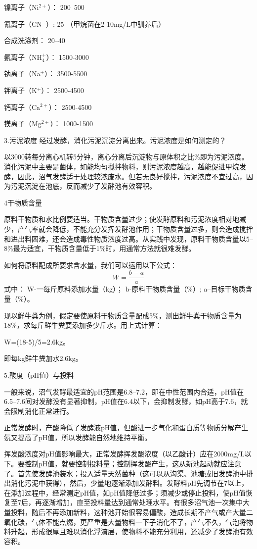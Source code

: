 \documentclass{ctexbook}
\begin{document}
镍离子（Ni$^{2+}$）：	  200~500

氰离子（CN$^{-}$）:	25 （甲烷菌在2-10mg/L中驯养后）

合成洗涤剂：	20--40

氨离子（NH$_4^{+}$）：	1500-3000

钠离子（Na$^{+}$）：	3500-5500

钾离子（K$^{+}$）：	2500-4500

钙离子（Ca$^{2+}$）：	2500-4500

镁离子（Mg$^{2+}$）：	1000-1500

3.污泥浓度	
经过发酵，消化污泥沉淀分离出来。污泥浓度是如何测定的？

以3000转每分离心机转5分钟，离心分离后沉淀物与原体积之比\%即为污泥浓度。消化污泥中主要是菌体，如能均匀搅拌物料，则污泥浓度越高，越能促进甲烷发酵，因此，沼气发酵适于处理较浓废水。但若无良好搅拌，污泥浓度不宜过高，因为污泥沉淀在池底，反而减少了发酵池有效容积。

4干物质含量

原料干物质和水比例要适当。干物质含量过少；使发酵原料和污泥浓度相对地减少，产气率就会降低，不能充分发挥发酵池作用；干物质含量过多，则会造成搅拌和进出料困难，还会造成毒性物质浓度过高。从实践中发现，原料干物质含量以5--8\%最为适宜，干物质含量低于1\%时，用通常方法就很难发酵。

如何将原料配成所要求含水量，我们可以运用以下公式：
\begin{equation*}
	W=\frac{b-a}{a}
\end{equation*}
式中：	
W-一每斤原料添加水量（kg）；
b-原料干物质含量（\%）;
a--目标干物质含量（\%）。

现以鲜牛粪为例，假定要使原料干物质含量配成5\%，测出鲜牛粪干物质含量为18\%，求每斤鲜牛粪要添加多少斤水。用上式计算：

W=(18-5)/5=2.6kg。

即每kg鲜牛粪加水2.6kg。

5.酸度（pH值）与投料

一般来说，沼气发酵最适宜的pH范围是6.8--7.2，即在中性范围内合适，pH值在6.5--7.6间对发酵没有显著抑制，pH值在6.4以下，会抑制发酵，如pH高于7.6，就会限制消化正常进行。

正常发酵时，产酸降低了发酵液pH值，但酸进一步气化和蛋白质等物质分解产生氨又提高了pH值，所以发酵能自然地维持平衡。

挥发酸浓度对pH值影响最大，正常发酵挥发酸浓度（以乙酸计）应在2000mg/L以下。要控制pH值，就要控制投料量；控制挥发酸产生，这从新池起动就应注意了。首先使发酵池装水；投入适量天然菌种（这可以从沟渠、池塘或旧发酵池中排出消化污泥中获得），然后，少量地逐渐添加发酵料。发酵料pH先调节在7以上，在添加过程中，经常测定pH值，如pH值降低过多；须减少或停止投料，使pH值恢复至7后，再逐渐增加，直至投料量达到通常处理水平。有很多沼气池一次集中大量投料，随后不再添加新料，这种池开始很容易偏酸，造成长期不产气或产大量二氧化碳，气体不能点燃，更严重是大量物料一下子消化不了，产气不久，气泡将物料升起，形成很厚且难以消化浮渣层，使物料不能充分利用，还减少了发酵池有效容积。
\end{document}
